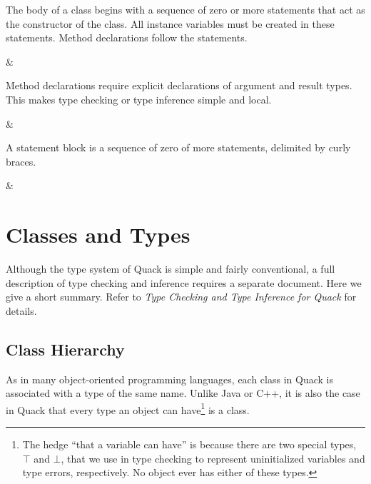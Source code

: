 \documentclass[11pt]{article}
\begin{document}
The body of a class begins with a sequence of zero or more statements
that act as the constructor of the class.  All instance variables must
be created in these statements.  Method declarations follow the
statements.  

\begin{grammar}
 & {\EnterBlock} 
  {\LeaveBlock}
\end{grammar}

Method declarations require explicit declarations of argument and
result types.  This makes type checking or type inference simple and
local. 

\begin{grammar}
 & 
      
    \literal{(}  \literal{)} 
    \newline
\end{grammar}


\noindent A statement block is a sequence of zero of more statements,
delimited by curly braces. 

\begin{grammar}
   &
  {\EnterBlock}  {\LeaveBlock}
\end{grammar}


\section{Classes and Types}

Although the type system of Quack is simple and fairly conventional,
a full description of type checking and inference requires a separate
document.  Here we give a short summary.  Refer to \emph{Type Checking
  and Type Inference for Quack} for details. 

\subsection{Class Hierarchy}

As in many object-oriented programming languages, each class in Quack
is associated with a type of the same name.   Unlike Java or C++, it
is also the case in Quack that every type an object  can
have\footnote{The hedge ``that a variable can have'' is because there
  are two special types, $\top$ and $\bot$, that we use in type
  checking to represent uninitialized variables and
  type errors, respectively.  No object ever has either of these types.}
is a class.
\end{document}
